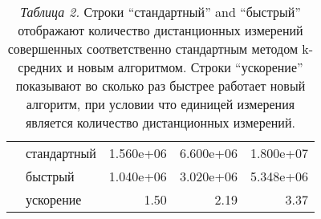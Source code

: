 \begin{table}
\begin{tabular}{|llrrr|}
             & стандартный &   1.560e+06 &    6.600e+06 &     1.800e+07 \\
             & быстрый     &   1.040e+06 &    3.020e+06 &     5.348e+06 \\
             & ускорение   &        1.50 &         2.19 &          3.37 \\ \hline
  \end{tabular}
  \caption*{\footnotesize \textit{Таблица 2.} Строки ``стандартный'' and ``быстрый'' отображают количество дистанционных измерений совершенных соответственно стандартным методом k-средних и новым алгоритмом. Строки ``ускорение'' показывают во сколько раз быстрее работает новый алгоритм, при условии что единицей измерения является количество дистанционных измерений.}
\end{table}
